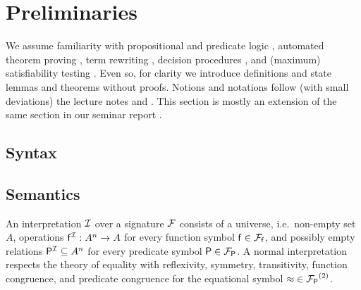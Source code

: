 
\chapter{Preliminaries}

We assume familiarity with propositional and predicate logic \cite{Huth:2004:LCS:975331}, 
automated theorem proving \cite{Fitting:1996:FLA:230183}, 
term rewriting \cite{Baader:1998:TR:280474}, 
decision procedures \cite{Kroening:2008:DPA:1391237}, 
and (maximum) satisfiability testing \cite{Biere:2009:HSV:1550723}.
Even so, for clarity we introduce
definitions and state lemmas and theorems without proofs.
Notions and notations follow (with small deviations) the lecture notes \cite{AM2015tr} and \cite{GM2013ar}.
This section is mostly an extension of the same section in our seminar report \cite{axm:SR2}.

\section{Syntax}
















\section{Semantics}

\begin{definition}
	An {\myem interpretation} ${\mathcal I}$ over a signature ${\mathcal F}$ consists 
	of a {\myem universe}, i.e.~non-empty set  $A$,
	operations ${\mathsf f}^{\mathcal I}: A^n\rightarrow A$  for every function symbol ${\mathsf f}\in{{\mathcal F}_{\mathsf f}}$, 
	and possibly empty relations ${\mathsf P}^{\mathcal I}\subseteq A^n$ for every predicate symbol ${\mathsf P}\in{{\mathcal F}_{\mathsf P}}$.
	A {\myem normal interpretation} respects the theory of equality
	with reflexivity, symmetry, transitivity, function congruence, and predicate congruence
	for the equational symbol ${\approx}\in{{\mathcal F}_{\mathsf P}}^{(2)}$.
\end{definition}

